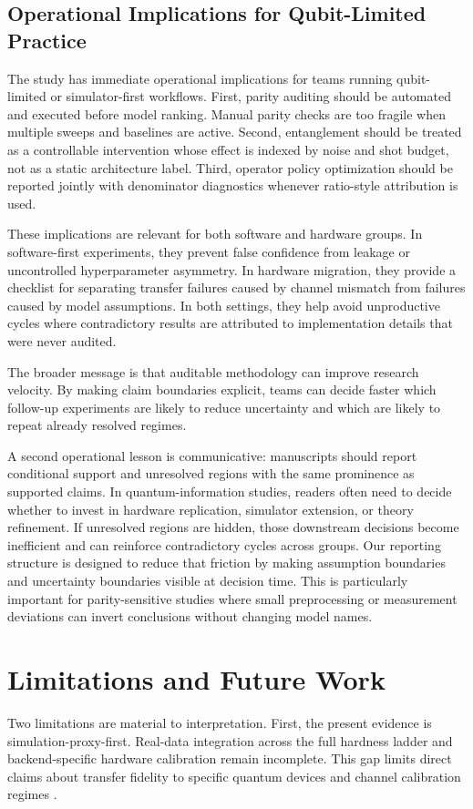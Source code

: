 \documentclass{article} %
\begin{document}
\subsection{Operational Implications for Qubit-Limited Practice}
The study has immediate operational implications for teams running qubit-limited or simulator-first workflows. First, parity auditing should be automated and executed before model ranking. Manual parity checks are too fragile when multiple sweeps and baselines are active. Second, entanglement should be treated as a controllable intervention whose effect is indexed by noise and shot budget, not as a static architecture label. Third, operator policy optimization should be reported jointly with denominator diagnostics whenever ratio-style attribution is used.

These implications are relevant for both software and hardware groups. In software-first experiments, they prevent false confidence from leakage or uncontrolled hyperparameter asymmetry. In hardware migration, they provide a checklist for separating transfer failures caused by channel mismatch from failures caused by model assumptions. In both settings, they help avoid unproductive cycles where contradictory results are attributed to implementation details that were never audited.

The broader message is that auditable methodology can improve research velocity. By making claim boundaries explicit, teams can decide faster which follow-up experiments are likely to reduce uncertainty and which are likely to repeat already resolved regimes.

A second operational lesson is communicative: manuscripts should report conditional support and unresolved regions with the same prominence as supported claims. In quantum-information studies, readers often need to decide whether to invest in hardware replication, simulator extension, or theory refinement. If unresolved regions are hidden, those downstream decisions become inefficient and can reinforce contradictory cycles across groups. Our reporting structure is designed to reduce that friction by making assumption boundaries and uncertainty boundaries visible at decision time. This is particularly important for parity-sensitive studies where small preprocessing or measurement deviations can invert conclusions without changing model names.

\section{Limitations and Future Work}
\label{sec:limits}
Two limitations are material to interpretation.
First, the present evidence is simulation-proxy-first. Real-data integration across the full hardness ladder and backend-specific hardware calibration remain incomplete. This gap limits direct claims about transfer fidelity to specific quantum devices and channel calibration regimes \citep{arxiv_2407_02553,arxiv_2310_06706,arxiv_2602_00610}.
\end{document}
